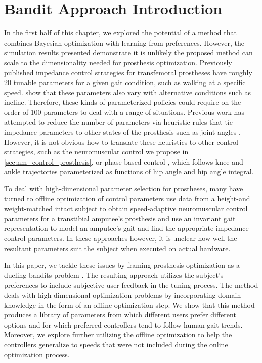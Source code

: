 \section{Bandit Approach Introduction}\label{sec:bandit_intro}

In the first half of this chapter, we explored the potential of a method that
combines Bayesian optimization with learning from preferences. However, the
simulation results presented demonstrate it is unlikely the proposed method
can scale to the dimensionality needed for prosthesis optimization. Previously
published impedance control strategies for transfemoral prostheses have roughly
20 tunable parameters for a given gait condition, such as walking at a specific
speed. \citet{sup2011upslope} show that these parameters also vary with
alternative conditions such as incline.  Therefore, these kinds of parameterized
policies could require on the order of 100 parameters to deal with a range of
situations. Previous work has attempted to reduce the number of parameters via
heuristic rules that tie impedance parameters to other states of the prosthesis
such as joint angles \citep{simon2014configuring}.  However, it is not obvious
how to translate these heuristics to other control strategies, such as the
neuromuscular control we propose in \cref{sec:nm_control_prosthesis}, or
phase-based control \citep{quintero2016preliminary}, which follows knee and
ankle trajectories parameterized as functions of hip angle and hip angle
integral.

To deal with high-dimensional parameter selection for prostheses, many have
turned to offline optimization of control parameters \citet{markowitz2011speed}
use data from a height-and weight-matched intact subject to obtain
speed-adaptive neuromuscular control parameters for a transtibial amputee's
prosthesis and \citet{aghasadeghi2013learning} use an invariant gait
representation to model an amputee's gait and find the appropriate impedance
control parameters. In these approaches however, it is unclear how well the
resultant parameters suit the subject when executed on actual hardware.

In this paper, we tackle these issues by framing prosthesis optimization as a
dueling bandits problem \citep{yue2012k}. The resulting approach utilizes the
subject's preferences to include subjective user feedback in the tuning process.
The method deals with high dimensional optimization problems by incorporating
domain knowledge in the form of an offline optimization step. We show that this
method produces a library of parameters from which different users prefer
different options and for which preferred controllers tend to follow human gait
trends. Moreover, we explore further utilizing the offline optimization to help
the controllers generalize to speeds that were not included during the online
optimization process.
